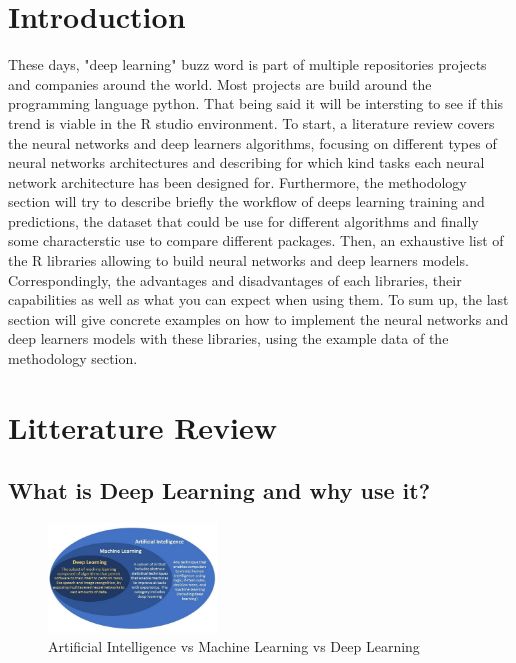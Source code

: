 \documentclass[letter,8pt]{article}\usepackage[]{graphicx}\usepackage[]{color}
\begin{document}
\section{Introduction}
These days, "deep learning" buzz word is part of multiple repositories projects and companies around the world. Most projects are build around the programming language python. That being said it will be intersting to see if this trend is viable in the R studio environment.
To start, a literature review covers the neural networks and deep learners algorithms, focusing on different types of neural networks architectures and describing for which kind tasks each neural network architecture has been designed for. Furthermore, the methodology section will try to describe briefly the workflow of deeps learning training and predictions, the dataset that could be use for different algorithms and finally some characterstic use to compare different packages. Then, an exhaustive list of the R libraries allowing to build neural networks and deep learners models. Correspondingly, the advantages and disadvantages of each libraries, their capabilities as well as what you can expect when using them. To sum up, the last section will give concrete examples on how to implement the neural networks and deep learners models with these libraries, using the example data of the methodology section.


\section{Litterature Review}
\subsection{What is Deep Learning and why use it?}
\begin{figure}
  \begin{center}
    \includegraphics[width=0.4\textwidth]{figure/deep learning.PNG}
      \end{center}
     \caption{Artificial Intelligence vs Machine Learning vs Deep Learning \cite{aivsdeepvsml}}
     \label{fig:simule}
\end{figure}
\end{document}
